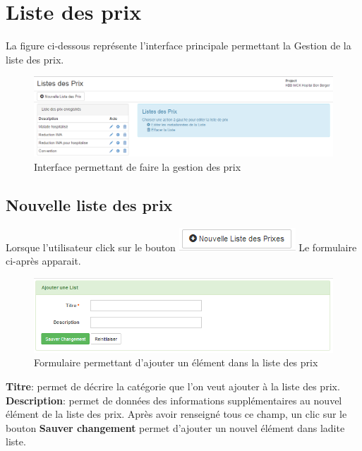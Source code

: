 \documentclass[12pt,a4paper]{report}
\begin{document}
\newpage
\section{Liste des prix}
La figure ci-dessous représente l'interface principale permettant la Gestion de la liste des prix. 
\begin{figure}[h]
\begin{center}
\includegraphics[width=12cm]{pic/ListePrix.png}
\end{center}
\caption{Interface permettant de faire la gestion des prix}
\label{Interface permettant de faire la gestion des prix}
\end{figure}

\subsection{Nouvelle liste des prix}
Lorsque l'utilisateur click sur le bouton \includegraphics[scale=0.7]{pic/NewListePrix.png} Le formulaire ci-après apparait.

\begin{figure}[h]
\begin{center}
\includegraphics[width=14cm]{pic/AjouterListePrix.png}
\end{center}
\caption{Formulaire permettant d'ajouter un élément dans la liste des prix}
\label{Formulaire permettant d'ajouter un élément dans la liste des prix}
\end{figure}

\textbf{Titre}: permet de décrire la catégorie que l'on veut ajouter à la liste des prix.
\textbf{Description}: permet de données des informations supplémentaires au nouvel élément de la liste des prix. 
Après avoir renseigné tous ce champ, un clic sur le bouton \textbf{Sauver changement} permet d'ajouter un nouvel élément dans ladite liste.
\end{document}
